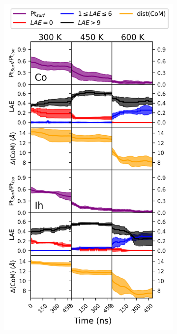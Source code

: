 \begin{figure}
     \hfill
     \begin{subfigure}[b]{0.31\textwidth}
         \centering
         \includegraphics[width=\textwidth]{figures/MD/Coal/923.png}
         \caption{}
         \label{fig:MD_Coal_923}
     \end{subfigure}
     \hfill
     \begin{subfigure}[b]{0.31\textwidth}

\end{subfigure}
\end{figure}
